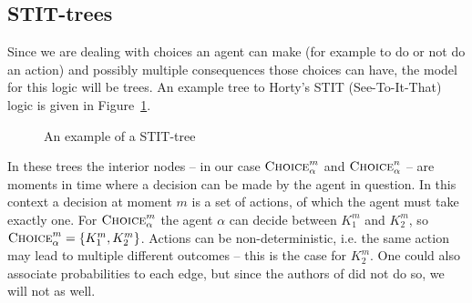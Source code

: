 \documentclass{article}
\begin{document}
\subsection{STIT-trees}
Since we are dealing with choices an agent can make (for example to do or not do an action) and possibly multiple consequences those choices can have, the model for this logic will be trees. An example tree to Horty's STIT (See-To-It-That) logic is given in Figure~\ref{fig:stit-tree}. 
\begin{figure}[ht]
    \centering
    \caption{An example of a STIT-tree}
    \label{fig:stit-tree}
\end{figure}

In these trees the interior nodes -- in our case $\textsc{Choice}^m_{\alpha}$ and $\textsc{Choice}^n_{\alpha}$ -- are moments in time where a decision can be made by the agent in question. In this context a decision at moment $m$ is a set of actions, of which the agent must take exactly one. For $\textsc{Choice}^m_{\alpha}$ the agent $\alpha$ can decide between $K_1^m$ and $K_2^m$, so $\textsc{Choice}^m_{\alpha} = \{K_1^m, K_2^m\}$. Actions can be non-deterministic, i.e. the same action may lead to multiple different outcomes -- this is the case for $K_2^m$. One could also associate probabilities to each edge, but since the authors of \cite{mdl} did not do so, we will not as well.
\end{document}
